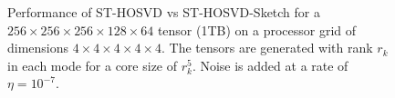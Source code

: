 \begin{figure}
	\caption{Performance of ST-HOSVD vs ST-HOSVD-Sketch for a $256{\times}256{\times}256{\times}128{\times}64$ tensor (1TB) on a processor grid of dimensions $4{\times}4{\times}4{\times}4{\times}4$. The tensors are generated with rank $r_k$ in each mode for a core size of $r_k^5$. Noise is added at a rate of $\eta = 10^{-7}$.}
\end{figure}